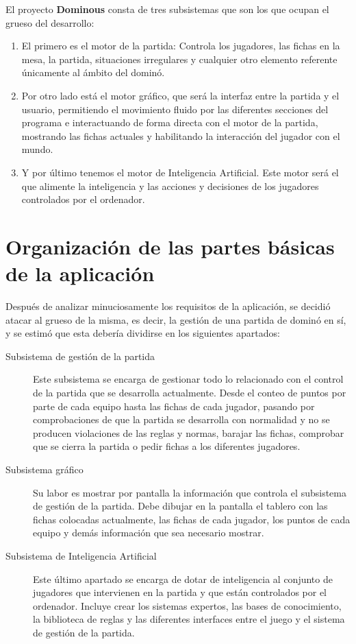El proyecto \textbf{Dominous} consta de tres subsistemas que son los que ocupan el grueso del desarrollo:
\begin{enumerate}
    \item El primero es el motor de la partida: Controla los jugadores, las fichas en la mesa, la partida, situaciones irregulares
            y cualquier otro elemento referente únicamente al ámbito del dominó.
    \item Por otro lado está el motor gráfico, que será la interfaz entre la partida y el usuario, permitiendo el movimiento
            fluido por las diferentes secciones del programa e interactuando de forma directa con el motor de la partida,
            mostrando las fichas actuales y habilitando la interacción del jugador con el mundo.
    \item Y por último tenemos el motor de Inteligencia Artificial. Este motor será el que alimente la inteligencia
            y las acciones y decisiones de los jugadores controlados por el ordenador.
\end{enumerate}

\section{Organización de las partes básicas de la aplicación}

Después de analizar minuciosamente los requisitos de la aplicación, se decidió atacar al grueso de la misma,
es decir, la gestión de una partida de dominó en sí, y se estimó que esta debería dividirse en los siguientes
apartados:

\begin{description}
    \item[Subsistema de gestión de la partida] Este subsistema se encarga de gestionar todo lo relacionado
            con el control de la partida que se desarrolla actualmente. Desde el conteo de puntos por parte
            de cada equipo hasta las fichas de cada jugador, pasando por comprobaciones de que la partida
            se desarrolla con normalidad y no se producen violaciones de las reglas y normas, barajar las
            fichas, comprobar que se cierra la partida o pedir fichas a los diferentes jugadores.
    \item[Subsistema gráfico] Su labor es mostrar por pantalla la información que controla el subsistema
            de gestión de la partida. Debe dibujar en la pantalla el tablero con las fichas colocadas
            actualmente, las fichas de cada jugador, los puntos de cada equipo y demás información que
            sea necesario mostrar.
    \item[Subsistema de Inteligencia Artificial] Este último apartado se encarga de dotar de inteligencia al
            conjunto de jugadores que intervienen en la partida y que están controlados por el ordenador. Incluye
            crear los sistemas expertos, las bases de conocimiento, la biblioteca de reglas y las diferentes
            interfaces entre el juego y el sistema de gestión de la partida.
\end{description}

